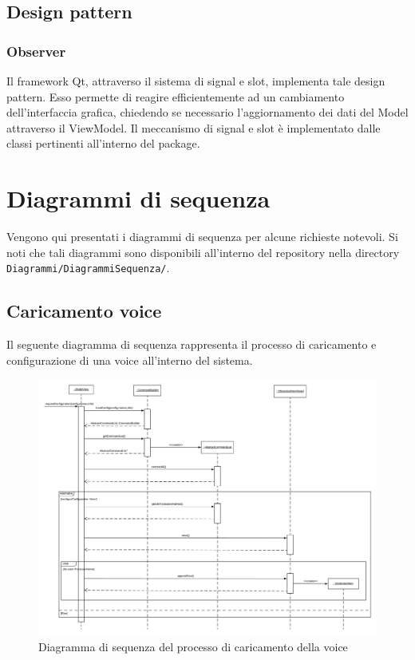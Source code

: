 \documentclass[openany,12pt,a4paper]{report}
\begin{document}
	\subsection{Design pattern}
	
	\subsubsection{Observer}
	Il framework Qt, attraverso il sistema di signal e slot, implementa tale design pattern. Esso permette di reagire efficientemente ad un cambiamento dell'interfaccia grafica, chiedendo se necessario l'aggiornamento dei dati del Model attraverso il ViewModel. Il meccanismo di signal e slot è implementato dalle classi pertinenti all'interno del package.  

	\newpage

	\section{Diagrammi di sequenza}
	
	Vengono qui presentati i diagrammi di sequenza per alcune richieste notevoli. Si noti che tali diagrammi sono disponibili all'interno del repository nella directory \verb|Diagrammi/DiagrammiSequenza/|.
	
	\subsection{Caricamento voice}
	
	Il seguente diagramma di sequenza rappresenta il processo di caricamento e configurazione di una voice all'interno del sistema. 
	
	\begin{figure}[H]
		\hspace*{-20mm}
		\includegraphics[scale=0.5]{CaricamentoVoice}
		\centering
		\caption{Diagramma di sequenza del processo di caricamento della voice}
	\end{figure}
	
\end{document}
